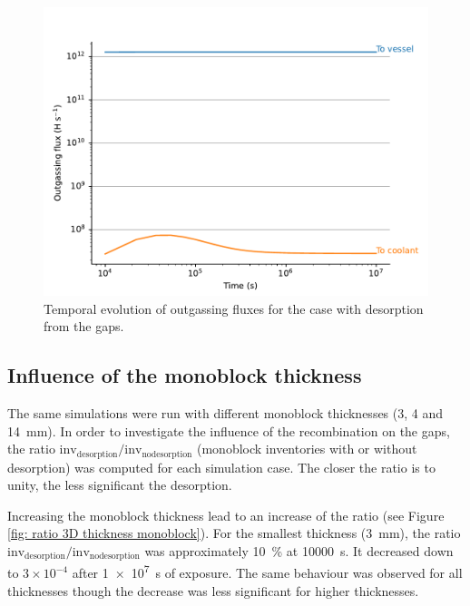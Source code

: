 \begin{figure} [h]
    \centering
    \includegraphics[width=\linewidth]{Figures/Chapter3/monoblocks/3D_monoblocks/fluxes.pdf}
    \caption{Temporal evolution of outgassing fluxes for the case with desorption from the gaps.}
    \label{fig: fluxes DEMO monoblock}
\end{figure}

\subsection{Influence of the monoblock thickness}

The same simulations were run with different monoblock thicknesses (3, 4 and \SI{14}{mm}).
In order to investigate the influence of the recombination on the gaps, the ratio $\mathrm{inv}_\mathrm{desorption} / \mathrm{inv}_\mathrm{no desorption}$ (monoblock inventories with or without desorption) was computed for each simulation case.
The closer the ratio is to unity, the less significant the desorption.

Increasing the monoblock thickness lead to an increase of the ratio (see Figure \ref{fig: ratio 3D thickness monoblock}).
For the smallest thickness (\SI{3}{mm}), the ratio $\mathrm{inv}_\mathrm{desorption} / \mathrm{inv}_\mathrm{no desorption}$ was approximately \SI{10}{\%} at \SI{10000}{s}.
It decreased down to $3\times 10^{-4}$ after \SI{1e7}{s} of exposure.
The same behaviour was observed for all thicknesses though the decrease was less significant for higher thicknesses.

